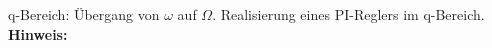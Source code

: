 \begin{question}[section=6,name={PI-Regler im q-Bereich},difficulty=,type=mdl,tags={}]
	q-Bereich: Übergang von $\omega$ auf $\Omega$. Realisierung eines PI-Reglers im q-Bereich.
	\\ \textbf{Hinweis:}\\
	
\end{question}
\begin{solution}
	
\end{solution}